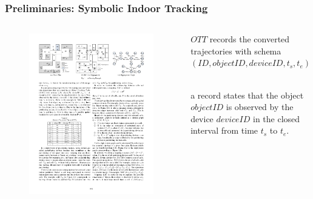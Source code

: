 \begin{frame}
\frametitle{Preliminaries: Symbolic Indoor Tracking}

\begin{columns}[c]
  \begin{figure}[tb]
    \includegraphics[width=\columnwidth]{figures/2-4/2-4-2.pdf}
  \end{figure}

  \begin{fitemize}
    \item {} ${OTT}$ records the converted trajectories with schema ${(ID, objectID, deviceID, t_s, t_e)}$
    ~\\
    \item a record states that the object ${objectID}$ is observed by the device ${deviceID}$ in the closed interval from time ${t_s}$ to ${t_e}$.
  \end{fitemize}

\end{columns}

\end{frame}

